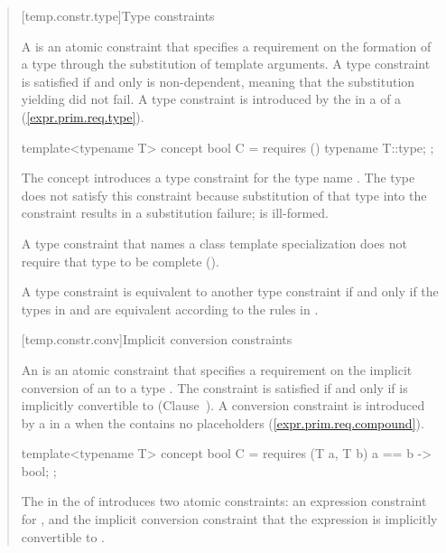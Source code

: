 \begin{quote}
[temp.constr.type]{Type constraints}

\pnum
A  is an atomic constraint that specifies a requirement 
on the formation of a type  through the substitution of template 
arguments.
% 
A type constraint is satisfied if and only  is non-dependent, meaning 
that the substitution yielding  did not fail.
% 
\enternote
A type constraint is introduced by the  in a
 of a 
(\ref{expr.prim.req.type}).
\exitnote
% 
\enterexample
\begin{codeblock}
template<typename T> concept bool C = requires () { typename T::type; };
\end{codeblock}
The concept  introduces a type constraint for the 
type name .
% 
The type  does not satisfy this constraint
because substitution of that type into the constraint results in a
substitution failure;  is ill-formed.
\exitexample

\pnum
A type constraint that names a class template specialization 
does not require that type to be complete 
().

\pnum
A type constraint  is equivalent to another type
constraint  if and only if the types in 
and  are equivalent according to the rules in
.


[temp.constr.conv]{Implicit conversion constraints}

\pnum
An  is an atomic constraint that 
specifies a requirement on the implicit conversion of an 
 to a type . 
% 
The constraint is satisfied if and only if  is implicitly convertible 
to  (Clause~).
% 
\enternote
A conversion constraint is introduced by a  
in a  when the 
 contains no placeholders 
(\ref{expr.prim.req.compound}).
\exitnote
% 
\enterexample
\begin{codeblock}
template<typename T> concept bool C = 
  requires (T a, T b) {
    { a == b } -> bool;
  };
\end{codeblock}
The  in the
 of  introduces two atomic 
constraints: an expression constraint for , and the implicit 
conversion constraint that the expression  is implicitly 
convertible to .
\exitexample


\end{quote}
